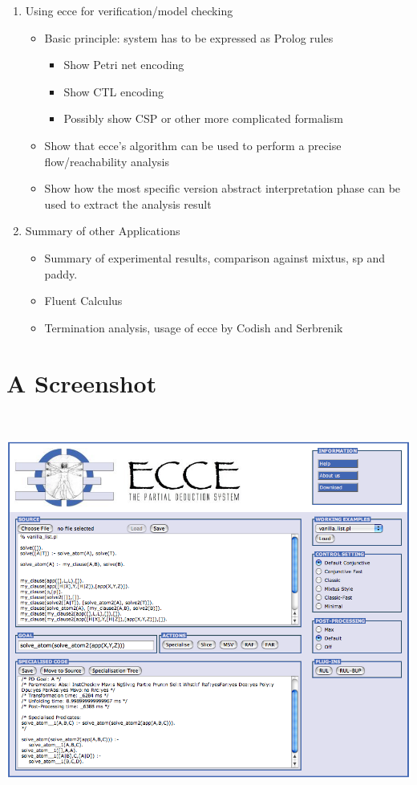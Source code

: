 \documentclass{sig-alternate}
\begin{document}
\begin{enumerate}
 \item Using {\sc ecce} for verification/model checking
  \begin{itemize}
    \item Basic principle: system has to be expressed as
     Prolog rules
      \begin{itemize}
        \item Show Petri net encoding
        \item Show CTL encoding
        \item Possibly show CSP or other more complicated formalism
       \end{itemize}
    \item  Show that {\sc ecce}'s algorithm can be used
     to perform a precise flow/reachability analysis
    \item Show how the most specific version abstract interpretation
     phase can be used to extract the analysis result
  \end{itemize}
    
    
 \item Summary of other Applications
    \begin{itemize}
    \item Summary of experimental results, comparison against 
     mixtus, sp and paddy.
    \item Fluent Calculus
    \item Termination analysis, usage of {\sc ecce} by Codish and Serbrenik
   \end{itemize}
  
  
\end{enumerate}

\newpage
\section{A Screenshot}
~\\
\centering
\begin{minipage}[t]{\textwidth}
  \includegraphics[width=\textwidth]{Screenshot_ecce}
\end{minipage}
\end{document}
